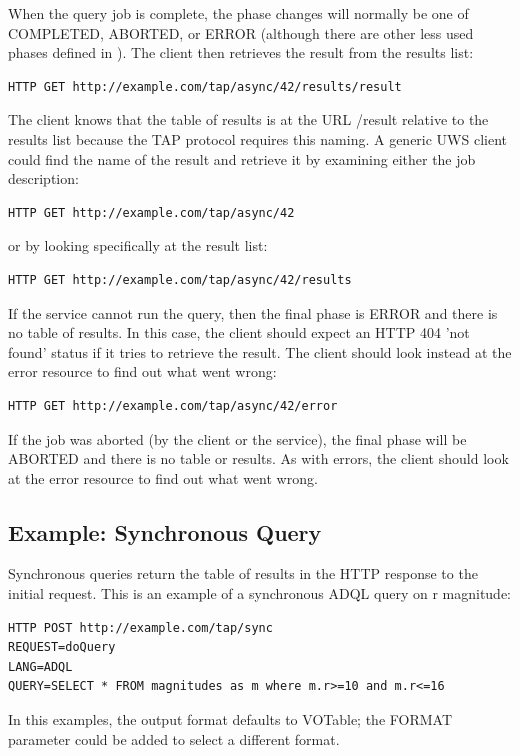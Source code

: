\documentclass[11pt,letter]{ivoa}
\begin{document}
When the query job is complete, the phase changes will normally be one of 
COMPLETED, ABORTED, or ERROR (although there are other less used phases defined 
in \citep{std:UWS}). The client then retrieves the result from the results list:
\begin{verbatim}
HTTP GET http://example.com/tap/async/42/results/result
\end{verbatim}
The client knows that the table of results is at the URL /result relative to the 
results list because the TAP protocol requires this naming. A generic UWS client 
could find the name of the result and retrieve it by examining either the job 
description:
\begin{verbatim}
HTTP GET http://example.com/tap/async/42
\end{verbatim}
or by looking specifically at the result list:
\begin{verbatim}
HTTP GET http://example.com/tap/async/42/results
\end{verbatim}
If the service cannot run the query, then the final phase is ERROR and there is 
no table of results. In this case, the client should expect an HTTP 404 'not 
found' status if it tries to retrieve the result. The client should look instead 
at the error resource to find out what went wrong:
\begin{verbatim}
HTTP GET http://example.com/tap/async/42/error
\end{verbatim}
If the job was aborted (by the client or the service), the final phase will be 
ABORTED and there is no table or results. As with errors, the client should look 
at the error resource to find out what went wrong.

\subsection{Example: Synchronous Query}

Synchronous queries return the table of results in the HTTP response to the 
initial request. This is an example of a synchronous ADQL query on r magnitude:

\begin{verbatim}
HTTP POST http://example.com/tap/sync
REQUEST=doQuery
LANG=ADQL
QUERY=SELECT * FROM magnitudes as m where m.r>=10 and m.r<=16
\end{verbatim}

In this examples, the output format defaults to VOTable; 
the FORMAT parameter could be added to select a different format.
\end{document}

